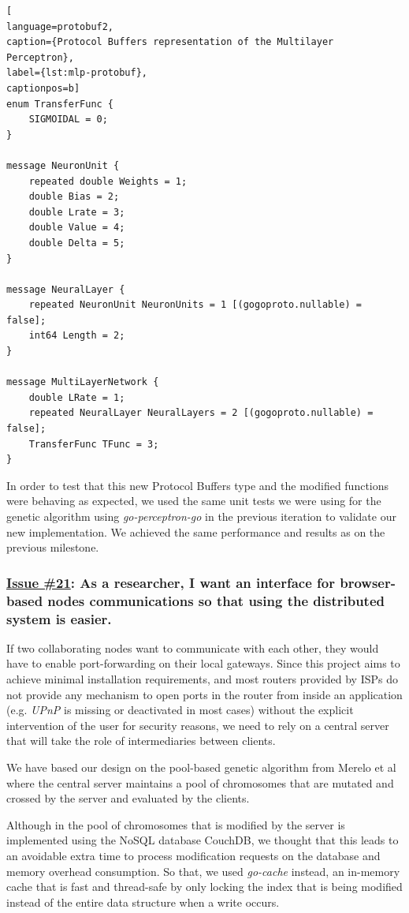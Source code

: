 \begin{lstlisting}[
language=protobuf2,
caption={Protocol Buffers representation of the Multilayer Perceptron},
label={lst:mlp-protobuf},
captionpos=b]
enum TransferFunc {
    SIGMOIDAL = 0;
}

message NeuronUnit {
    repeated double Weights = 1;
    double Bias = 2;
    double Lrate = 3;
    double Value = 4;
    double Delta = 5;
}

message NeuralLayer {
    repeated NeuronUnit NeuronUnits = 1 [(gogoproto.nullable) = false];
    int64 Length = 2;
}

message MultiLayerNetwork {
    double LRate = 1;
    repeated NeuralLayer NeuralLayers = 2 [(gogoproto.nullable) = false];
    TransferFunc TFunc = 3;
}
\end{lstlisting} 

In order to test that this new Protocol Buffers type and the modified functions were behaving as expected, we used the same unit tests we were using for the genetic algorithm using \textit{go-perceptron-go} in the previous iteration to validate our new implementation. We achieved the same performance and results as on the previous milestone.

\subsubsection*{\href{https://github.com/salvacorts/TFG-Parasitic-Metaheuristics/issues/21}{Issue \#21}: As a researcher, I want an interface for browser-based nodes communications so that using the distributed system is easier.}

If two collaborating nodes want to communicate with each other, they would have to enable port-forwarding on their local gateways. Since this project aims to achieve minimal installation requirements, and most routers provided by ISPs do not provide any mechanism to open ports in the router from inside an application (e.g. \textit{UPnP} \cite{wiki-upnp} is missing or deactivated in most cases) without the explicit intervention of the user for security reasons, we need to rely on a central server that will take the role of intermediaries between clients.

We have based our design on the pool-based genetic algorithm from Merelo et al \cite{paper-pool-jj} where the central server maintains a pool of chromosomes that are mutated and crossed by the server and evaluated by the clients.

Although in \cite{paper-pool-jj} the pool of chromosomes that is modified by the server is implemented using the NoSQL database CouchDB, we thought that this leads to an avoidable extra time to process modification requests on the database and memory overhead consumption. So that, we used \textit{go-cache} \cite{go-cache} instead, an in-memory cache that is fast and thread-safe by only locking the index that is being modified instead of the entire data structure when a write occurs.

